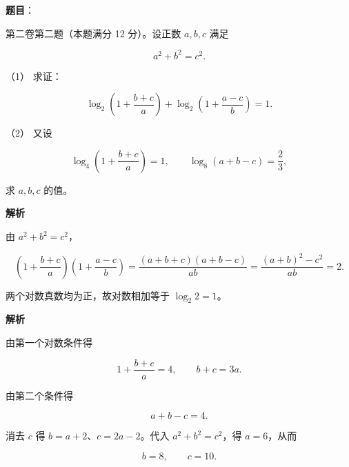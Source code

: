 \begin{answer}

\textbf{题目}：

第二卷第二题（本题满分 12 分）。设正数 $a,b,c$ 满足

\nopagebreak[4]
\[
a^2+b^2=c^2.
\]

（1） 求证：

\nopagebreak[4]
\[
\log_2\left(1+\frac{b+c}{a}\right)
+\log_2\left(1+\frac{a-c}{b}\right)=1.
\]

（2） 又设

\nopagebreak[4]
\[
\log_4\left(1+\frac{b+c}{a}\right)=1,\qquad
\log_8(a+b-c)=\frac23,
\]

求 $a,b,c$ 的值。

\textbf{解析}


由 $a^2+b^2=c^2$，

\nopagebreak[4]
\[
\left(1+\frac{b+c}{a}\right)
\left(1+\frac{a-c}{b}\right)
=\frac{(a+b+c)(a+b-c)}{ab}
=\frac{(a+b)^2-c^2}{ab}=2.
\]

两个对数真数均为正，故对数相加等于 $\log_2 2=1$。


\textbf{解析}

由第一个对数条件得

\nopagebreak[4]
\[
1+\frac{b+c}{a}=4,
\qquad b+c=3a.
\]

由第二个条件得

\nopagebreak[4]
\[
a+b-c=4.
\]

消去 $c$ 得 $b=a+2$、$c=2a-2$。代入 $a^2+b^2=c^2$，得 $a=6$，从而

\nopagebreak[4]
\[
b=8,\qquad c=10.
\]



\end{answer}
